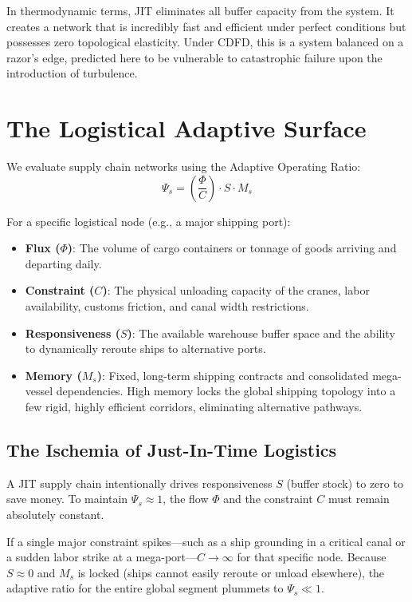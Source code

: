 \documentclass[11pt,a4paper]{article}
\begin{document}
In thermodynamic terms, JIT eliminates all buffer capacity from the system. It creates a network that is incredibly fast and efficient under perfect conditions but possesses zero topological elasticity. Under CDFD, this is a system balanced on a razor's edge, predicted here to be vulnerable to catastrophic failure upon the introduction of turbulence.

\section{The Logistical Adaptive Surface}
We evaluate supply chain networks using the Adaptive Operating Ratio:
\begin{equation}
    \Psi_s = \left( \frac{\Phi}{C} \right) \cdot S \cdot M_s
\end{equation}

For a specific logistical node (e.g., a major shipping port):
\begin{itemize}
    \item \textbf{Flux ($\Phi$)}: The volume of cargo containers or tonnage of goods arriving and departing daily.
    \item \textbf{Constraint ($C$)}: The physical unloading capacity of the cranes, labor availability, customs friction, and canal width restrictions.
    \item \textbf{Responsiveness ($S$)}: The available warehouse buffer space and the ability to dynamically reroute ships to alternative ports.
    \item \textbf{Memory ($M_s$)}: Fixed, long-term shipping contracts and consolidated mega-vessel dependencies. High memory locks the global shipping topology into a few rigid, highly efficient corridors, eliminating alternative pathways.
\end{itemize}

\subsection{The Ischemia of Just-In-Time Logistics}
A JIT supply chain intentionally drives responsiveness $S$ (buffer stock) to zero to save money. To maintain $\Psi_s \approx 1$, the flow $\Phi$ and the constraint $C$ must remain absolutely constant.

If a single major constraint spikes---such as a ship grounding in a critical canal or a sudden labor strike at a mega-port---$C \to \infty$ for that specific node. Because $S \approx 0$ and $M_s$ is locked (ships cannot easily reroute or unload elsewhere), the adaptive ratio for the entire global segment plummets to $\Psi_s \ll 1$.
\end{document}
